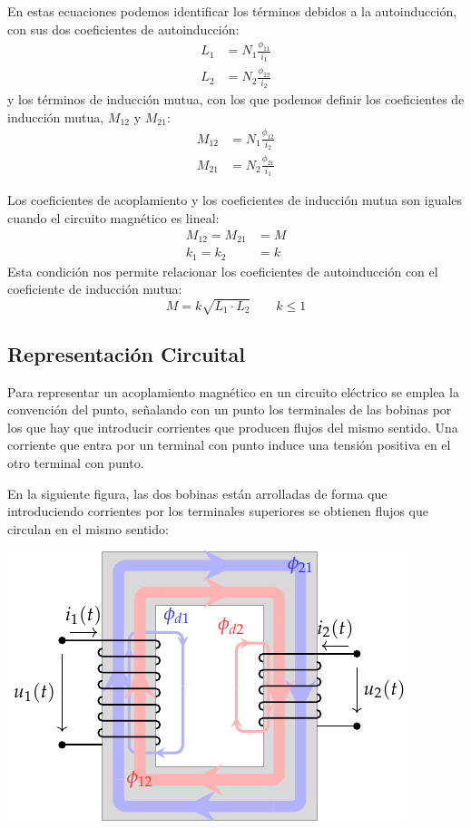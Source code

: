 En estas ecuaciones podemos identificar los términos debidos a la autoinducción, con sus dos coeficientes de autoinducción:
\begin{align}
  \label{eq:acoplamiento-autoinduccion}
  L_1 &= N_1 \frac{\phi_{11}}{i_1}\\
  L_2 &= N_2 \frac{\phi_{22}}{i_2}
\end{align}
y los términos de inducción mutua, con los que podemos definir los coeficientes de inducción mutua, $M_{12}$ y $M_{21}$:
\begin{align}
  \label{eq:coef-induccion-mutua}
  M_{12} &= N_1 \frac{\phi_{12}}{i_2}\\
  M_{21} &= N_2 \frac{\phi_{21}}{i_1}
\end{align}

Los coeficientes de acoplamiento y los coeficientes de inducción mutua son iguales cuando el circuito magnético es lineal:
  \begin{align*}
  M_{12} = M_{21} &= M\\
  k_1 = k_2 &= k    
  \end{align*}
  Esta condición nos permite relacionar los coeficientes de autoinducción con el coeficiente de inducción mutua:
  \begin{equation}
    \label{eq:L-M}
    \boxed{M = k \sqrt{L_1 \cdot L_2}} \qquad  k \leq 1
  \end{equation}

  \subsection{Representación Circuital}
  \label{sec:org1754ad3}
  Para representar un acoplamiento magnético en un circuito eléctrico
  se emplea la convención del punto, señalando con un punto los
  terminales de las bobinas por los que hay que introducir corrientes
  que producen flujos del mismo sentido. Una corriente que entra por
  un terminal con punto induce una tensión positiva en el otro
  terminal con punto.

  En la siguiente figura, las dos bobinas están arrolladas de forma
  que introduciendo corrientes por los terminales superiores se
  obtienen flujos que circulan en el mismo sentido:
  \begin{center}
    \includegraphics[height=0.2\textheight]{../figs/acoplamientoTikz.pdf}
  \end{center}


